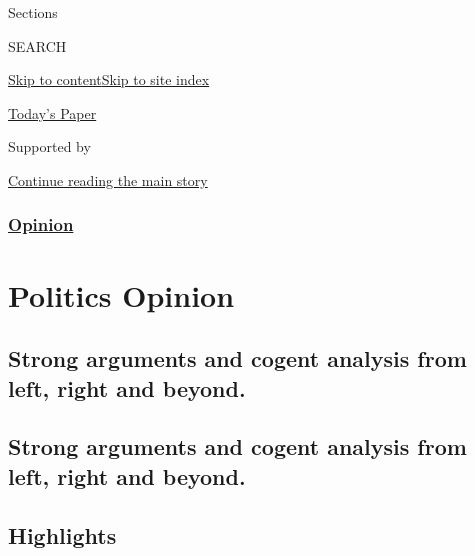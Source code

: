 Sections

SEARCH

\protect\hyperlink{site-content}{Skip to
content}\protect\hyperlink{site-index}{Skip to site index}

\href{https://myaccount.nytimes.com/auth/login?response_type=cookie\&client_id=vi}{}

\href{https://www.nytimes.com/section/todayspaper}{Today's Paper}

Supported by

\protect\hyperlink{after-sponsor}{Continue reading the main story}

\hypertarget{opinion}{%
\subsubsection{\texorpdfstring{\href{/section/opinion}{Opinion}}{Opinion}}\label{opinion}}

\hypertarget{politics--opinion}{%
\section{Politics \textbar{} Opinion}\label{politics--opinion}}

\hypertarget{strong-arguments-and-cogent-analysis-from-left-right-and-beyond}{%
\subsection{Strong arguments and cogent analysis from left, right and
beyond.}\label{strong-arguments-and-cogent-analysis-from-left-right-and-beyond}}

\hypertarget{strong-arguments-and-cogent-analysis-from-left-right-and-beyond-1}{%
\subsection{Strong arguments and cogent analysis from left, right and
beyond.}\label{strong-arguments-and-cogent-analysis-from-left-right-and-beyond-1}}

\hypertarget{highlights}{%
\subsection{Highlights}\label{highlights}}


